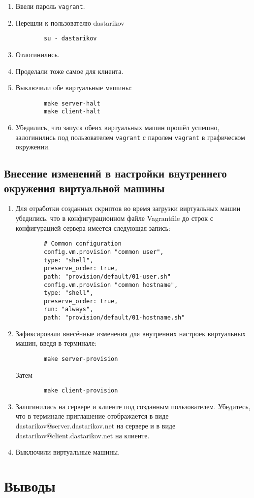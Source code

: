 \begin{enumerate}
    \item Ввели пароль \texttt{vagrant}.
    \item Перешли к пользователю dastarikov
        \begin{verbatim}
        su - dastarikov
        \end{verbatim}
    \item Отлогинились.
    \item Проделали тоже самое для клиента.
    \item Выключили обе виртуальные машины:
        \begin{verbatim}
        make server-halt
        make client-halt
        \end{verbatim}
    \item Убедились, что запуск обеих виртуальных машин прошёл успешно, залогинились под пользователем \texttt{vagrant} с паролем \texttt{vagrant} в графическом окружении.
\end{enumerate}

\subsection{Внесение изменений в настройки внутреннего окружения виртуальной машины}
\begin{enumerate}
    \item Для отработки созданных скриптов во время загрузки виртуальных машин убедились, что в конфигурационном файле Vagrantfile до строк с конфигурацией сервера имеется следующая запись:
        \begin{verbatim}
        # Common configuration
        config.vm.provision "common user",
        type: "shell",
        preserve_order: true,
        path: "provision/default/01-user.sh"
        config.vm.provision "common hostname",
        type: "shell",
        preserve_order: true,
        run: "always",
        path: "provision/default/01-hostname.sh"
        \end{verbatim}
    \item Зафиксировали внесённые изменения для внутренних настроек виртуальных машин, введя в терминале:
        \begin{verbatim}
        make server-provision
        \end{verbatim}
    Затем
        \begin{verbatim}
        make client-provision
        \end{verbatim}
    \item Залогинились на сервере и клиенте под созданным пользователем. Убедитесь, что в терминале приглашение отображается в виде dastarikov@server.dastarikov.net на сервере и в виде dastarikov@client.dastarikov.net на клиенте.
    \item Выключили виртуальные машины.
\end{enumerate}
%

\section{Выводы}


